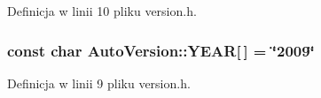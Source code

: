 Definicja w linii 10 pliku version.h.\hypertarget{a00019_c6726fe1f27cfa5f70c5eb624c6095fc}{
\subsubsection[{YEAR}]{\setlength{\rightskip}{0pt plus 5cm}const char {\bf AutoVersion::YEAR}\mbox{[}$\,$\mbox{]} = \char`\"{}2009\char`\"{}}}
\label{dd/da2/a00019_c6726fe1f27cfa5f70c5eb624c6095fc}




Definicja w linii 9 pliku version.h.